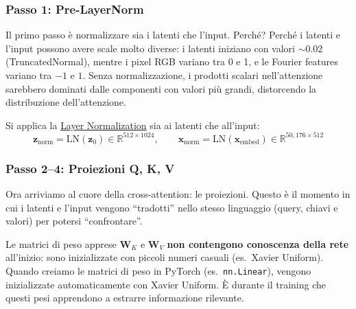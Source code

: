 \documentclass[12pt,a4paper]{article}
\begin{document}
\subsubsection{Passo 1: Pre-LayerNorm}

Il primo passo \`e normalizzare sia i latenti che l'input. Perch\'e? Perch\'e i latenti e l'input possono avere scale molto diverse: i latenti iniziano con valori $\sim 0.02$ (TruncatedNormal), mentre i pixel RGB variano tra 0 e 1, e le Fourier features variano tra $-1$ e $1$. Senza normalizzazione, i prodotti scalari nell'attenzione sarebbero dominati dalle componenti con valori pi\`u grandi, distorcendo la distribuzione dell'attenzione.

Si applica la \hyperref[sec:layernorm]{Layer Normalization} sia ai latenti che all'input:
\[
    \mathbf{z}_{\text{norm}} = \text{LN}(\mathbf{z}_0) \in \mathbb{R}^{512 \times 1024}, \qquad \mathbf{x}_{\text{norm}} = \text{LN}(\mathbf{x}_{\text{embed}}) \in \mathbb{R}^{50{,}176 \times 512}
\]

\subsubsection{Passo 2--4: Proiezioni Q, K, V} \label{sec:qkv_proiezioni}

Ora arriviamo al cuore della cross-attention: le proiezioni. Questo \`e il momento in cui i latenti e l'input vengono ``tradotti'' nello stesso linguaggio (query, chiavi e valori) per potersi ``confrontare''.

Le matrici di peso apprese $\mathbf{W}_K$ e $\mathbf{W}_V$ \textbf{non contengono conoscenza della rete} all'inizio: sono inizializzate con piccoli numeri casuali (es.\ Xavier Uniform). Quando creiamo le matrici di peso in PyTorch (es.\ \texttt{nn.Linear}), vengono inizializzate automaticamente con Xavier Uniform. \`E durante il training che questi pesi apprendono a estrarre informazione rilevante.
\end{document}

